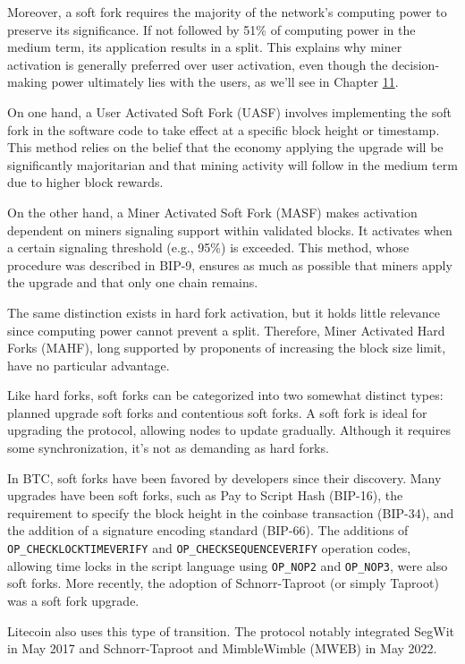 \documentclass[
  a5paper,
  smalldemyvopaper,10pt,twoside,onecolumn,openright,extrafontsizes,hidelinks]{memoir}
\begin{document}
Moreover, a soft fork requires the majority of the network's computing
power to preserve its significance. If not followed by 51\% of computing
power in the medium term, its application results in a split. This
explains why miner activation is generally preferred over user
activation, even though the decision-making power ultimately lies with
the users, as we'll see in Chapter \hyperref[ch:determination]{11}.

On one hand, a User Activated Soft Fork (UASF) involves implementing the
soft fork in the software code to take effect at a specific block height
or timestamp. This method relies on the belief that the economy applying
the upgrade will be significantly majoritarian and that mining activity
will follow in the medium term due to higher block rewards.

On the other hand, a Miner Activated Soft Fork (MASF) makes activation
dependent on miners signaling support within validated blocks. It
activates when a certain signaling threshold (e.g., 95\%) is exceeded.
This method, whose procedure was described in BIP-9, ensures as much as
possible that miners apply the upgrade and that only one chain remains.

The same distinction exists in hard fork activation, but it holds little
relevance since computing power cannot prevent a split. Therefore, Miner
Activated Hard Forks (MAHF), long supported by proponents of increasing
the block size limit, have no particular advantage.

Like hard forks, soft forks can be categorized into two somewhat
distinct types: planned upgrade soft forks and contentious soft forks. A
soft fork is ideal for upgrading the protocol, allowing nodes to update
gradually. Although it requires some synchronization, it's not as
demanding as hard forks.

In BTC, soft forks have been favored by developers since their
discovery. Many upgrades have been soft forks, such as Pay to Script
Hash (BIP-16), the requirement to specify the block height in the
coinbase transaction (BIP-34), and the addition of a signature encoding
standard (BIP-66). The additions of \texttt{OP\_CHECKLOCKTIMEVERIFY} and
\texttt{OP\_CHECKSEQUENCEVERIFY} operation codes, allowing time locks in
the script language using \texttt{OP\_NOP2} and \texttt{OP\_NOP3}, were
also soft forks. More recently, the adoption of Schnorr-Taproot (or
simply Taproot) was a soft fork upgrade.

Litecoin also uses this type of transition. The protocol notably
integrated SegWit in May 2017 and Schnorr-Taproot and MimbleWimble
(MWEB) in May 2022.
\end{document}
